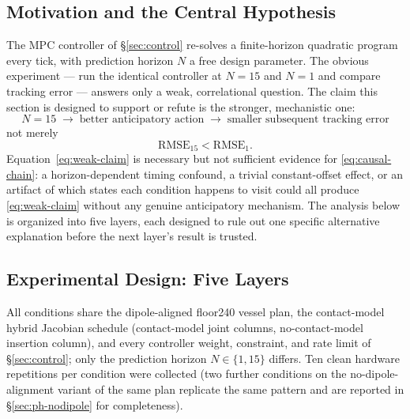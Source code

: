 \documentclass[journal]{IEEEtran}
\begin{document}
\subsection{Motivation and the Central Hypothesis}
\label{sec:ph-motivation}

The MPC controller of \S\ref{sec:control} re-solves a finite-horizon
quadratic program every tick, with prediction horizon $N$ a free
design parameter. The obvious experiment --- run the identical
controller at $N{=}15$ and $N{=}1$ and compare tracking error ---
answers only a weak, correlational question. The claim this section
is designed to support or refute is the stronger, mechanistic one:
\begin{equation}
\boxed{
N{=}15 \;\rightarrow\; \text{better anticipatory action}
\;\rightarrow\; \text{smaller subsequent tracking error}
}
\label{eq:causal-chain}
\end{equation}
not merely
\begin{equation}
\boxed{\mathrm{RMSE}_{15} < \mathrm{RMSE}_{1}.}
\label{eq:weak-claim}
\end{equation}
Equation~\eqref{eq:weak-claim} is necessary but not sufficient
evidence for \eqref{eq:causal-chain}: a horizon-dependent timing
confound, a trivial constant-offset effect, or an artifact of which
states each condition happens to visit could all produce
\eqref{eq:weak-claim} without any genuine anticipatory mechanism. The
analysis below is organized into five layers, each designed to rule
out one specific alternative explanation before the next layer's
result is trusted.

\subsection{Experimental Design: Five Layers}
\label{sec:ph-design}

All conditions share the dipole-aligned floor240 vessel plan, the
contact-model hybrid Jacobian schedule (contact-model joint columns,
no-contact-model insertion column), and every controller weight,
constraint, and rate limit of \S\ref{sec:control}; only the
prediction horizon $N\in\{1,15\}$ differs. Ten clean hardware
repetitions per condition were collected (two further conditions on
the no-dipole-alignment variant of the same plan replicate the same
pattern and are reported in \S\ref{sec:ph-nodipole} for completeness).
\end{document}
